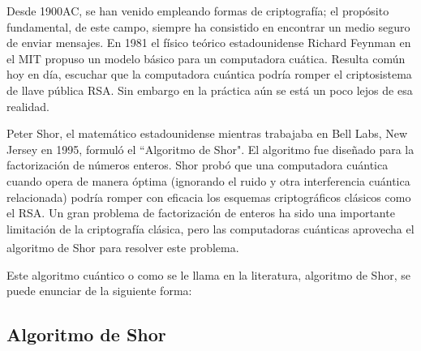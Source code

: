 \documentclass[a4paper,11pt]{article}
\begin{document}
\par Desde 1900AC, se han venido empleando formas de criptografía; el propósito fundamental, de este campo, siempre ha consistido en encontrar un medio seguro de enviar mensajes.  En 1981 el físico teórico estadounidense Richard Feynman en el MIT propuso un modelo básico para un computadora cuática. Resulta común hoy en día, escuchar que la computadora cuántica podría romper el criptosistema de llave pública RSA. Sin embargo en la práctica aún se está un poco lejos de esa realidad.

\par Peter Shor, el matemático estadounidense mientras trabajaba en Bell Labs, New Jersey en 1995, formuló el ``Algoritmo de Shor". El algoritmo fue diseñado para la factorización de números enteros. Shor probó que una computadora cuántica cuando opera de manera óptima (ignorando el ruido y otra interferencia cuántica relacionada) podría romper con eficacia los esquemas criptográficos clásicos como el RSA. Un gran problema de factorización de enteros ha sido una importante limitación de la criptografía clásica, pero las computadoras cuánticas aprovecha el algoritmo de Shor para resolver este problema\textsuperscript{\textcolor{cyan}{\cite{2}}}.\\

\par Este algoritmo cuántico o como se le llama en la literatura, algoritmo de Shor, se puede enunciar de la siguiente forma:

\subsection*{\normalsize Algoritmo de Shor}
\end{document}
